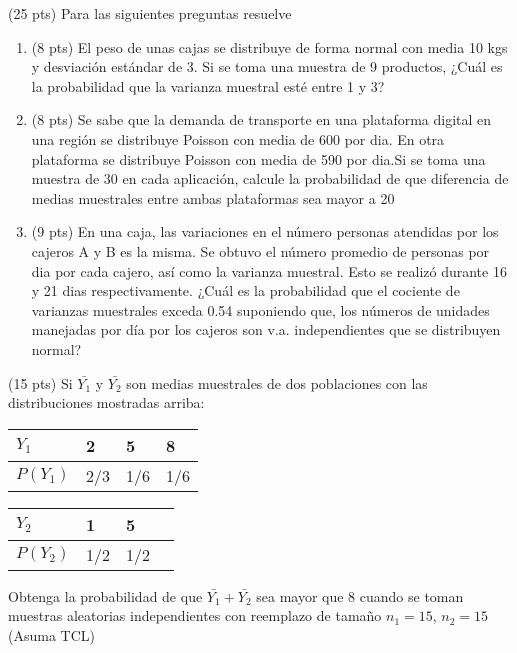 \documentclass[addpoints]{exam}
\theoremstyle{mytheor}
\begin{document}
  \begin{questions} 

  \question (25 pts)
  Para las siguientes preguntas resuelve 
  \begin{enumerate}
  \item (8 pts) El peso de unas cajas se distribuye de forma normal con media 10 kgs y desviación estándar de 3. Si se toma una muestra de 9 productos, ¿Cuál es la probabilidad que la varianza  muestral esté entre 1 y 3?
  \item (8 pts) Se sabe que la demanda de transporte en una plataforma digital en una región se distribuye Poisson con media de 600 por dia. En otra plataforma se distribuye Poisson con media de 590 por dia.Si se toma una muestra de 30 en cada aplicación, calcule la probabilidad de que diferencia de medias muestrales entre ambas plataformas sea mayor a 20
  \item (9 pts) En una caja, las variaciones en el número personas atendidas por los cajeros A y B es la misma. Se obtuvo el número promedio de personas por dia por cada cajero, así como la varianza muestral. Esto se realizó durante 16 y 21 dias respectivamente. ¿Cuál es la probabilidad que el cociente de varianzas muestrales exceda 0.54 suponiendo que, los números de unidades manejadas por día por los cajeros son v.a. independientes que se distribuyen normal?
  \end{enumerate}

\question (15 pts) Si $\bar{Y_1}$ y $\bar{Y_2}$ son medias muestrales de dos poblaciones con las distribuciones mostradas arriba:

\begin{table}[h!]
\centering
\begin{tabular}{llll}
$Y_1$ & 2 & 5 & 8 \\ \hline
$P(Y_1)$ & 2/3 & 1/6 & 1/6 
\end{tabular}
\end{table}

\begin{table}[h!]
\centering
\begin{tabular}{llll}
$Y_2$ & 1 & 5 \\ \hline
$P(Y_2)$ & 1/2 & 1/2
\end{tabular}
\end{table}

Obtenga la probabilidad de que $\bar{Y_1} + \bar{Y_2}$ sea mayor que 8 cuando se toman muestras aleatorias independientes con reemplazo de tamaño $n_1 = 15$, $n_2 = 15$ (Asuma TCL)


\end{questions}
\end{document}
